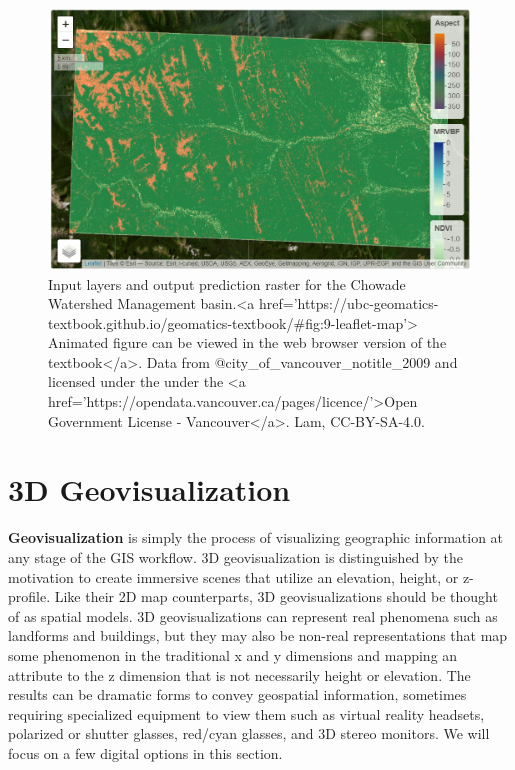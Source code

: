 \documentclass[
]{book}
\begin{document}
\begin{figure}
\includegraphics[width=1\linewidth]{images/09-leaflet-map-layers} \caption{Input layers and output prediction raster for the Chowade Watershed Management basin.<a href='https://ubc-geomatics-textbook.github.io/geomatics-textbook/#fig:9-leaflet-map'> Animated figure can be viewed in the web browser version of the textbook</a>. Data from @city_of_vancouver_notitle_2009 and licensed under the  under the <a href='https://opendata.vancouver.ca/pages/licence/'>Open Government License - Vancouver</a>. Lam, CC-BY-SA-4.0.}\label{fig:9-leaflet-map-layers}
\end{figure}

\section{3D Geovisualization}\label{d-geovisualization}

\textbf{Geovisualization} is simply the process of visualizing geographic information at any stage of the GIS workflow. 3D geovisualization is distinguished by the motivation to create immersive scenes that utilize an elevation, height, or z-profile. Like their 2D map counterparts, 3D geovisualizations should be thought of as spatial models. 3D geovisualizations can represent real phenomena such as landforms and buildings, but they may also be non-real representations that map some phenomenon in the traditional x and y dimensions and mapping an attribute to the z dimension that is not necessarily height or elevation. The results can be dramatic forms to convey geospatial information, sometimes requiring specialized equipment to view them such as virtual reality headsets, polarized or shutter glasses, red/cyan glasses, and 3D stereo monitors. We will focus on a few digital options in this section.
\end{document}
